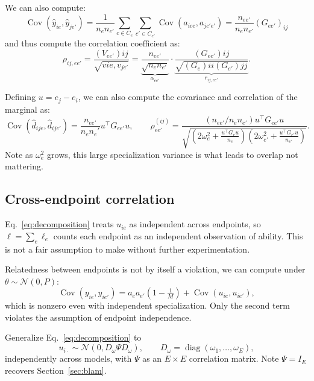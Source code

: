 \documentclass{article}
\DeclareMathOperator{\Cov}{Cov}
\begin{document}
We can also compute:
\begin{equation}
    \Cov(\hat{y}_{ie}, \hat{y}_{je'}) = \frac{1}{n_en_{e'}}\sum_{c\in C_e}\sum_{c'\in C_{e'}} \Cov(a_{ice}, a_{jc'e'}) = \frac{n_{ee'}}{n_e n_{e'}}(G_{ee'})_{ij}
\end{equation}
and thus compute the correlation coefficient as:
\begin{equation}
    \rho_{ij,ee'} = \frac{(V_{ee'}){ij}}{\sqrt{v{ie}, v_{je'}}} = \underbrace{\frac{n_{ee'}}{\sqrt{n_e n_{e'}}}}_{\alpha_{ee'}} \cdot \underbrace{\frac{(G_{ee'}){ij}}{\sqrt{(G_e){ii}(G_{e'}){jj}}}}_{r_{ij,ee'}}.
\end{equation}

Defining $u = e_j - e_i$, we can also compute the covariance and correlation of the marginal as:
\begin{equation}
    \Cov(\hat{d}_{ije}, \hat{d}_{ije'}) = \frac{n_{ee'}}{n_e n_e'}u^\top G_{ee'}u, \qquad \rho_{ee'}^{(ij)} = \frac{(n_{ee'}/n_en_{e'}) u^\top G_{ee'}u}{\sqrt{(2\omega_e^2 + \frac{u^\top G_e u}{n_e})(2\omega_{e'}^2 + \frac{u^\top G_{e'}u}{n_{e'}})}}.
\end{equation}
Note as $\omega_e^2$ grows, this large specialization variance is what leads to overlap not mattering.

\subsection{Cross-endpoint correlation}
\label{app:endpoint-correlation}

Eq.~\ref{eq:decomposition} treats $u_{ie}$ as independent across endpoints, so
$\ell = \sum_e \ell_e$ counts each endpoint as an independent observation of
ability. This is not a fair assumption to make without further experimentation.

Relatedness between endpoints is not by itself a violation, we can compute under $\theta \sim \mathcal{N}(0,P)$:
\begin{equation}
  \Cov(y_{ie}, y_{ie'}) = a_e a_{e'}\left(1 - \tfrac{1}{M}\right) + \Cov(u_{ie}, u_{ie'}),
\end{equation}
which is nonzero even with independent specialization. Only the second term
violates the assumption of endpoint independence.

Generalize Eq.~\ref{eq:decomposition} to
\begin{equation}
  u_{i\cdot} \sim \mathcal{N}(0, D_\omega \Psi D_\omega), \qquad
  D_\omega = \operatorname{diag}(\omega_1,\dots,\omega_E),
\end{equation}
independently across models, with $\Psi$ as an $E\times E$ correlation matrix. Note
$\Psi = I_E$ recovers Section~\ref{sec:blam}. 
\end{document}

